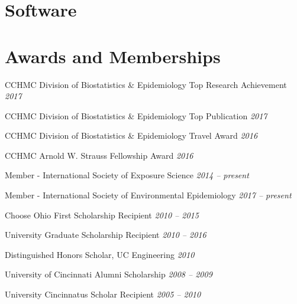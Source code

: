 \documentclass[margin,line]{res}
\newenvironment{list3}{
  \begin{list}{}{%
      \setlength{\itemsep}{0in}
      \setlength{\parsep}{0in} \setlength{\parskip}{0in}
      \setlength{\topsep}{0in} \setlength{\partopsep}{0in}
      \setlength{\leftmargin}{0in}}}{\end{list}}
\begin{document}
\begin{resume}
\section{\sc Software}


\section{\sc Awards and Memberships}

\begin{list3} \itemsep 4pt
\item[] CCHMC Division of Biostatistics \& Epidemiology Top Research Achievement \hfill \textit{2017}
\item[] CCHMC Division of Biostatistics \& Epidemiology Top Publication \hfill \textit{2017}
\item[] CCHMC Division of Biostatistics \& Epidemiology Travel Award \hfill \textit{2016}
\item[] CCHMC Arnold W. Strauss Fellowship Award \hfill \textit{2016}
\item[] Member - International Society of Exposure Science \hfill \textit{2014 -- present}
\item[] Member - International Society of Environmental Epidemiology \hfill \textit{2017 -- present}
\item[] Choose Ohio First Scholarship Recipient \hfill \textit{2010 -- 2015}
\item[] University Graduate Scholarship Recipient \hfill \textit{2010 -- 2016}
\item[] Distinguished Honors Scholar, UC Engineering \hfill \textit{2010}
\item[] University of Cincinnati Alumni Scholarship \hfill \textit{2008 -- 2009}
\item[] University Cincinnatus Scholar Recipient \hfill \textit{2005 -- 2010}
\end{list3}



\end{resume}
\end{document}
